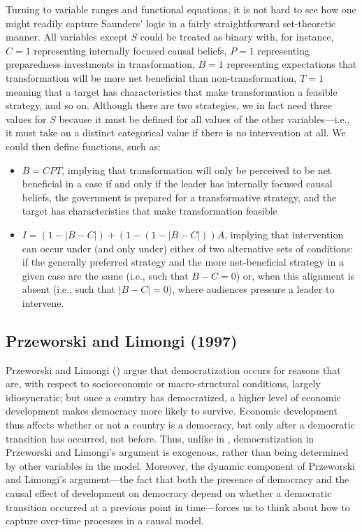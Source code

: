 \documentclass[12pt,]{book}
\providecommand{\tightlist}{%
  \setlength{\itemsep}{0pt}\setlength{\parskip}{0pt}}
\begin{document}
Turning to variable ranges and functional equations, it is not hard to see how one might readily capture Saunders' logic in a fairly straightforward set-theoretic manner. All variables except \(S\) could be treated as binary with, for instance, \(C=1\) representing internally focused causal beliefs, \(P=1\) representing preparedness investments in transformation, \(B=1\) representing expectations that transformation will be more net beneficial than non-transformation, \(T=1\) meaning that a target has characteristics that make transformation a feasible strategy, and so on. Although there are two strategies, we in fact need three values for \(S\) because it must be defined for all values of the other variables---i.e., it must take on a distinct categorical value if there is no intervention at all. We could then define functions, such as:

\begin{itemize}
\tightlist
\item
  \(B=CPT\), implying that transformation will only be perceived to be net beneficial in a case if and only if the leader has internally focused causal beliefs, the government is prepared for a transformative strategy, and the target has characteristics that make transformation feasible
\item
  \(I=(1-|B-C|)+(1-(1-|B-C|))A\), implying that intervention can occur under (and only under) either of two alternative sets of conditions: if the generally preferred strategy and the more net-beneficial strategy in a given case are the same (i.e., such that \(B-C=0\)) or, when this alignment is absent (i.e., such that \(|B-C|=0\)), where audiences pressure a leader to intervene.
\end{itemize}

\hypertarget{przeworski-and-limongi-1997}{%
\subsection{Przeworski and Limongi (1997)}\label{przeworski-and-limongi-1997}}

Przeworski and Limongi (\citet{przeworski1997modernization}) argue that democratization occurs for reasons that are, with respect to socioeconomic or macro-structural conditions, largely idiosyncratic; but once a country has democratized, a higher level of economic development makes democracy more likely to survive. Economic development thus affects whether or not a country is a democracy, but only after a democratic transition has occurred, not before. Thus, unlike in \citet{boix2003democracy}, democratization in Przeworski and Limongi's argument is exogenous, rather than being determined by other variables in the model. Moreover, the dynamic component of Przeworski and Limongi's argument---the fact that both the presence of democracy and the causal effect of development on democracy depend on whether a democratic transition occurred at a previous point in time---forces us to think about how to capture over-time processes in a causal model.
\end{document}
